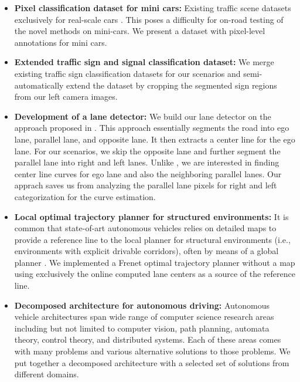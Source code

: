 \begin{itemize}
    \item \textbf{Pixel classification dataset for mini cars:} Existing traffic
        scene datasets exclusively for real-scale cars \cite{Huang2018TheAD,
        Cordts2016TheCD, Geiger2012AreWR, Neuhold2017TheMV}. This poses a
        difficulty for on-road testing of the novel methods on mini-cars. We
        present a dataset with pixel-level annotations for mini cars.
    \item \textbf{Extended traffic sign and signal classification dataset:} We
        merge existing traffic sign classification datasets \cite{cite11,
        cite12, Shakhuro2016RussianTS, Serna2018ClassificationOT,
        MaldonadoBascn2007RoadSignDA} for our scenarios and semi-automatically
        extend the dataset by cropping the segmented sign regions from our left
        camera images.
    \item \textbf{Development of a lane detector:} We build our lane detector
        on the approach proposed in \cite{cite9}. This approach essentially
        segments the road into ego lane, parallel lane, and opposite lane. It
        then extracts a center line for the ego lane. For our scenarios, we
        skip the opposite lane and further segment the parallel lane into right
        and left lanes.  Unlike \cite{cite9}, we are interested in finding
        center line curves for ego lane and also the neighboring parallel
        lanes. Our apprach saves us from analyzing the parallel lane pixels for
        right and left categorization for the curve estimation.
    \item \textbf{Local optimal trajectory planner for structured
        environments:} It is common that state-of-art autonomous vehicles
        relies on detailed maps to provide a reference line to the local
        planner for structural environments (i.e., environments with explicit
        drivable corridors), often by means of a global planner
        \cite{Thrun2006StanleyTR, cite1, Kato2018Autoware0B}. We implemented a
        Frenet optimal trajectory planner \cite{cite14} without a map using
        exclusively the online computed lane centers as a source of the
        reference line.
    \item
        \textbf{Decomposed architecture for autonomous driving:} Autonomous
        vehicle architectures span wide range of computer science research
        areas including but not limited to computer vision, path planning,
        automata theory, control theory, and distributed systems.  Each of
        these areas comes with many problems and various alternative solutions
        to those problems. We put together a decomposed architecture
        with a selected set of solutions from different domains.
\end{itemize}

